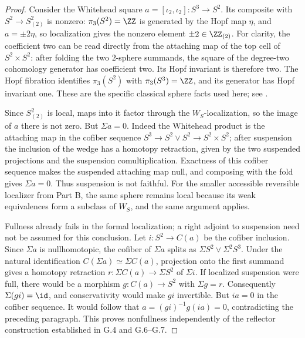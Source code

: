 \begin{proof}
Consider the Whitehead square $a=[\iota_2,\iota_2]:S^3\to S^2$. Its composite with $S^2\to S^2_{(2)}$ is nonzero: $\pi_3(S^2)=\ZZ$ is generated by the Hopf map $\eta$, and $a=\pm2\eta$, so localization gives the nonzero element $\pm2\in\ZZ_{(2)}$. For clarity, the coefficient two can be read directly from the attaching map of the top cell of $S^2\times S^2$: after folding the two $2$-sphere summands, the square of the degree-two cohomology generator has coefficient two. Its Hopf invariant is therefore two. The Hopf fibration identifies $\pi_3(S^2)$ with $\pi_3(S^3)=\ZZ$, and its generator has Hopf invariant one. These are the specific classical sphere facts used here; see \cite[Example 4.51, pp.~380--381, and the proof of Corollary 4J.4, p.~474]{FGHHatcher2002}.

Since $S^2_{(2)}$ is local, maps into it factor through the $W_S$-localization, so the image of $a$ there is not zero. But $\Sigma a=0$. Indeed the Whitehead product is the attaching map in the cofiber sequence $S^3\to S^2\vee S^2\to S^2\times S^2$; after suspension the inclusion of the wedge has a homotopy retraction, given by the two suspended projections and the suspension comultiplication. Exactness of this cofiber sequence makes the suspended attaching map null, and composing with the fold gives $\Sigma a=0$. Thus suspension is not faithful. For the smaller accessible reversible localizer from Part B, the same sphere remains local because its weak equivalences form a subclass of $W_S$, and the same argument applies.

Fullness already fails in the formal localization; a right adjoint to suspension need not be assumed for this conclusion. Let $i:S^2\to C(a)$ be the cofiber inclusion. Since $\Sigma a$ is nullhomotopic, the cofiber of $\Sigma a$ splits as $\Sigma S^2\vee\Sigma^2 S^3$. Under the natural identification $C(\Sigma a)\simeq\Sigma C(a)$, projection onto the first summand gives a homotopy retraction $r:\Sigma C(a)\to\Sigma S^2$ of $\Sigma i$. If localized suspension were full, there would be a morphism $g:C(a)\to S^2$ with $\Sigma g=r$. Consequently $\Sigma(gi)=\id$, and conservativity would make $gi$ invertible. But $ia=0$ in the cofiber sequence. It would follow that $a=(gi)^{-1}g(ia)=0$, contradicting the preceding paragraph. This proves nonfullness independently of the reflector construction established in G.4 and G.6--G.7.


\end{proof}
